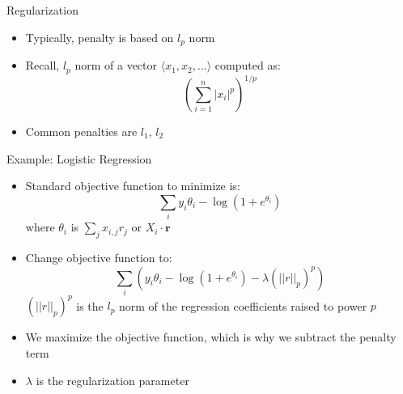\documentclass[aspectratio=169]{beamer}
\begin{document}

\begin{frame}{Regularization}

\begin{itemize}
\item Typically, penalty is based on $l_p$ norm
\item Recall, $l_p$ norm of a vector $\langle x_1, x_2, ... \rangle$ computed as:
$$\left(\sum_{i = 1}^n |x_i|^p \right)^{1/p}$$
\item Common penalties are $l_1$, $l_2$
\end{itemize}
\end{frame}

%
%

\begin{frame}{Example: Logistic Regression}

\begin{itemize}
\item Standard objective function to minimize is:
$$\sum_i y_i \theta_i - \log(1 + e^{\theta_i})$$
where $\theta_i$ is $\sum_j x_{i,j} r_j$ or $X_i \cdot \boldsymbol{r}$
\item Change objective function to:
$$\sum_i \left( y_i \theta_i - \log(1 + e^{\theta_i}) - \lambda (||r||_p)^p \right)$$
$(||r||_p)^p$ is the $l_p$ norm of the regression coefficients raised to power $p$
\item We maximize the objective function, which  is why we subtract the penalty term
\item $\lambda$ is the regularization parameter
\end{itemize}
\end{frame}
\end{document}
